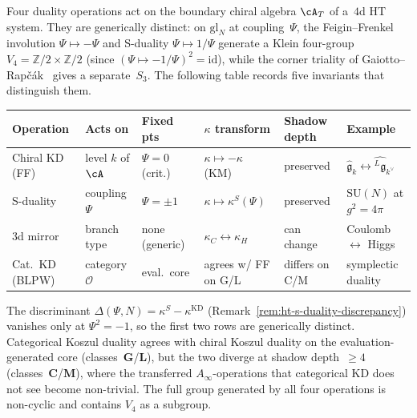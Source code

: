 \begin{remark}
\label{rem:ht-four-dualities-comparison}
Four duality operations act on the boundary chiral algebra
$\cA_T$ of a~$4$d HT system. They are generically distinct:
on $\mathrm{gl}_N$ at coupling~$\Psi$,
the Feigin--Frenkel involution $\Psi \mapsto -\Psi$
and S-duality $\Psi \mapsto 1/\Psi$
generate a Klein four-group
$V_4 = \mathbb{Z}/2 \times \mathbb{Z}/2$
(since $(\Psi \mapsto -1/\Psi)^2 = \mathrm{id}$),
while the corner triality of
Gaiotto--Rap\v{c}\'ak~\cite{gaiotto-rapchak}
gives a separate~$S_3$.
The following table records five invariants that distinguish them.

\begin{center}
\renewcommand{\arraystretch}{1.25}
\footnotesize
\begin{tabular}{llllll}
\toprule
\textbf{Operation}
& \textbf{Acts on}
& \textbf{Fixed pts}
& \textbf{$\kappa$ transform}
& \textbf{Shadow depth}
& \textbf{Example} \\
\midrule
Chiral KD (FF)
 & level $k$ of $\cA$
 & $\Psi = 0$ (crit.)
 & $\kappa \mapsto -\kappa$ (KM)
 & preserved
 & $\widehat{\mathfrak{g}}_k \leftrightarrow
 \widehat{{}^L\!\mathfrak{g}}_{k^\vee}$ \\[3pt]
S-duality
 & coupling $\Psi$
 & $\Psi = \pm 1$
 & $\kappa \mapsto \kappa^S(\Psi)$
 & preserved
 & $\mathrm{SU}(N)$ at $g^2 = 4\pi$ \\[3pt]
3d mirror
 & branch type
 & none (generic)
 & $\kappa_C \leftrightarrow \kappa_H$
 & can change
 & Coulomb $\leftrightarrow$ Higgs \\[3pt]
Cat.\ KD (BLPW)
 & category $\mathcal{O}$
 & eval.\ core
 & agrees w/ FF on G/L
 & differs on C/M
 & symplectic duality~\cite{BLPW16} \\
\bottomrule
\end{tabular}
\end{center}

\noindent
The discriminant $\Delta(\Psi,N) = \kappa^S - \kappa^{\mathrm{KD}}$
(Remark~\ref{rem:ht-s-duality-discrepancy})
vanishes only at $\Psi^2 = -1$, so the first two rows are
generically distinct. Categorical Koszul duality
agrees with chiral Koszul duality on the evaluation-generated
core (classes~$\mathbf{G}$/$\mathbf{L}$), but the two diverge
at shadow depth~$\geq 4$ (classes~$\mathbf{C}$/$\mathbf{M}$),
where the transferred $A_\infty$-operations
that categorical KD does not see become non-trivial.
The full group generated by all four operations is
non-cyclic and contains $V_4$ as a subgroup.
\end{remark}

